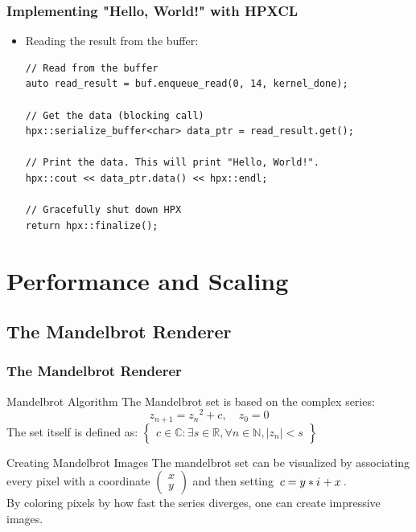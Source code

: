 \documentclass{beamer}
\begin{document}
\begin{frame}[fragile]
    \frametitle{Implementing "Hello, World!" with HPXCL}
    \begin{itemize}
        \item Reading the result from the buffer:
        \begin{lstlisting}[firstnumber=81]
// Read from the buffer
auto read_result = buf.enqueue_read(0, 14, kernel_done);

// Get the data (blocking call)
hpx::serialize_buffer<char> data_ptr = read_result.get();

// Print the data. This will print "Hello, World!".
hpx::cout << data_ptr.data() << hpx::endl;

// Gracefully shut down HPX
return hpx::finalize();
        \end{lstlisting}
    \end{itemize}
\end{frame}



\section{Performance and Scaling}

\newcommand{\iu}{{\mathnormal{i}\mkern1mu}}
\subsection{The Mandelbrot Renderer} %
\begin{frame}
    \frametitle{The Mandelbrot Renderer}
    \begin{block}{Mandelbrot Algorithm}
        The Mandelbrot set is based on the complex series:\\
        $$z_{n+1} = {z_n}^2 + c, \quad  z_0 = 0$$
    The set itself is defined as:
    $\begin{Bmatrix}c \in \mathbb{C}: \exists s \in \mathbb{R}, \forall n \in \mathbb{N},
                    |z_n| < s\end{Bmatrix}$\\
    \end{block}
    \begin{block}{Creating Mandelbrot Images}
        The mandelbrot set can be visualized by associating every pixel with
        a coordinate $\begin{pmatrix}x\\y\end{pmatrix}$ and then setting 
        $\,c = y * \iu + x\,$.
        \\
        By coloring pixels by how fast the series diverges, one can create
        impressive images.
    \end{block}
\end{frame}
\end{document}

